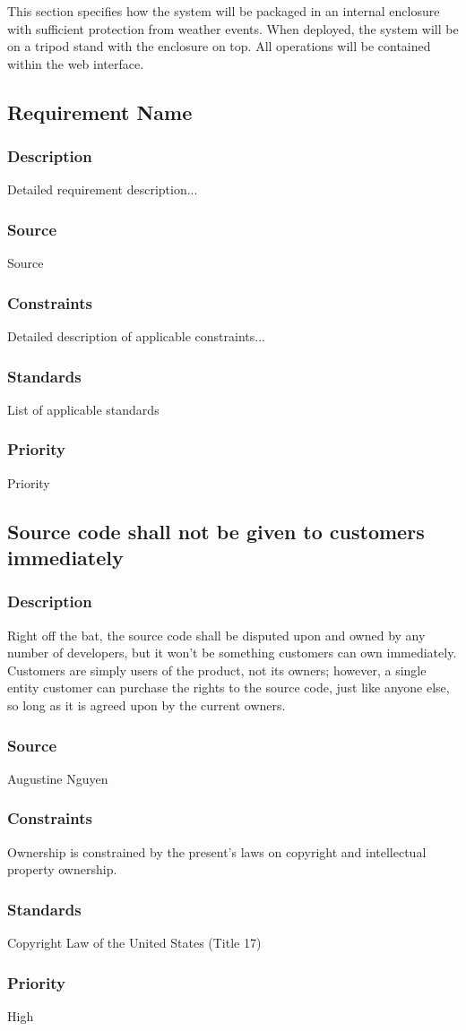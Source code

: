 This section specifies how the system will be packaged in an internal enclosure with sufficient protection from weather events. When deployed, the system will be on a tripod stand with the enclosure on top. All operations will be contained within the web interface.

\subsection{Requirement Name}
\subsubsection{Description}
Detailed requirement description...
\subsubsection{Source}
Source
\subsubsection{Constraints}
Detailed description of applicable constraints...
\subsubsection{Standards}
List of applicable standards
\subsubsection{Priority}
Priority

\subsection{Source code shall not be given to customers immediately}
\subsubsection{Description}
Right off the bat, the source code shall be disputed upon and owned by any number of developers, but it won't be something customers can own immediately.  Customers are simply users of the product, not its owners; however, a single entity customer can purchase the rights to the source code, just like anyone else, so long as it is agreed upon by the current owners.
\subsubsection{Source}
Augustine Nguyen
\subsubsection{Constraints}
Ownership is constrained by the present's laws on copyright and intellectual property ownership.
\subsubsection{Standards}
Copyright Law of the United States (Title 17)
\subsubsection{Priority}
High